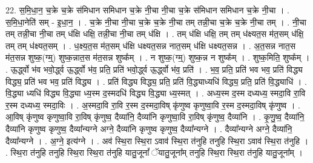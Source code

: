 \documentclass[17pt]{extarticle}
\begin{document}
22. स॒मि॒धा॒न॒ च॒क्रे च॒क्रे स॑मिधान समिधान च॒क्रे नी॒चा नी॒चा च॒क्रे स॑मिधान समिधान च॒क्रे नी॒चा । . स॒मि॒धा॒नेति॑ सम् - इ॒धा॒न॒ । . च॒क्रे नी॒चा नी॒चा च॒क्रे च॒क्रे नी॒चा तम् तन्नी॒चा च॒क्रे च॒क्रे नी॒चा तम् । . नी॒चा तम् तन्नी॒चा नी॒चा तम् ध॑क्षि धक्षि॒ तन्नी॒चा नी॒चा तम् ध॑क्षि । . तम् ध॑क्षि धक्षि॒ तम् तम् ध॑क्ष्यत॒स म॑त॒सम् ध॑क्षि॒ तम् तम् ध॑क्ष्यत॒सम् । . ध॒क्ष्य॒त॒स म॑त॒सम् ध॑क्षि धक्ष्यत॒सन्न नात॒सम् ध॑क्षि धक्ष्यत॒सन्न । . अ॒त॒सन्न नात॒स म॑त॒सन्न शुष्क॒(ग्म्॒) शुष्क॒न्नात॒स म॑त॒सन्न शुष्क᳚म् । . न शुष्क॒(ग्म्॒) शुष्क॒न्न न शुष्क᳚म् । . शुष्क॒मिति॒ शुष्क᳚म् । . ऊ॒र्द्ध्वो भ॑व भवो॒र्द्ध्व ऊ॒र्द्ध्वो भ॑व॒ प्रति॒ प्रति॑ भवो॒र्द्ध्व ऊ॒र्द्ध्वो भ॑व॒ प्रति॑ । . भ॒व॒ प्रति॒ प्रति॑ भव भव॒ प्रति॑ विद्ध्य विद्ध्य॒ प्रति॑ भव भव॒ प्रति॑ विद्ध्य । . प्रति॑ विद्ध्य विद्ध्य॒ प्रति॒ प्रति॑ वि॒द्ध्याध्यधि॑ विद्ध्य॒ प्रति॒ प्रति॑ वि॒द्ध्याधि॑ । . वि॒द्ध्या ध्यधि॑ विद्ध्य वि॒द्ध्या ध्य॒स्म द॒स्मदधि॑ विद्ध्य वि॒द्ध्या ध्य॒स्मत् । . अध्य॒स्म द॒स्म दध्यध्य॒ स्मदा॒वि रा॒वि र॒स्म दध्यध्य॒ स्मदा॒विः । . अ॒स्मदा॒वि रा॒वि र॒स्म द॒स्मदा॒विष् कृ॑णुष्व कृणुष्वा॒वि र॒स्म द॒स्मदा॒विष् कृ॑णुष्व । . आ॒विष् कृ॑णुष्व कृणुष्वा॒वि रा॒विष् कृ॑णुष्व॒ दैव्या॑नि॒ दैव्या॑नि कृणुष्वा॒वि रा॒विष् कृ॑णुष्व॒ दैव्या॑नि । . कृ॒णु॒ष्व॒ दैव्या॑नि॒ दैव्या॑नि कृणुष्व कृणुष्व॒ दैव्या᳚न्यग्ने अग्ने॒ दैव्या॑नि कृणुष्व कृणुष्व॒ दैव्या᳚न्यग्ने । . दैव्या᳚न्यग्ने अग्ने॒ दैव्या॑नि॒ दैव्या᳚न्यग्ने । . अ॒ग्ने॒ इत्य॑ग्ने । . अव॑ स्थि॒रा स्थि॒रा ऽवाव॑ स्थि॒रा त॑नुहि तनुहि स्थि॒रा ऽवाव॑ स्थि॒रा त॑नुहि । . स्थि॒रा त॑नुहि तनुहि स्थि॒रा स्थि॒रा त॑नुहि यातु॒जूनां᳚ ॅयातु॒जूना᳚म् तनुहि स्थि॒रा स्थि॒रा त॑नुहि यातु॒जूना᳚म् । \newline
\end{document}
